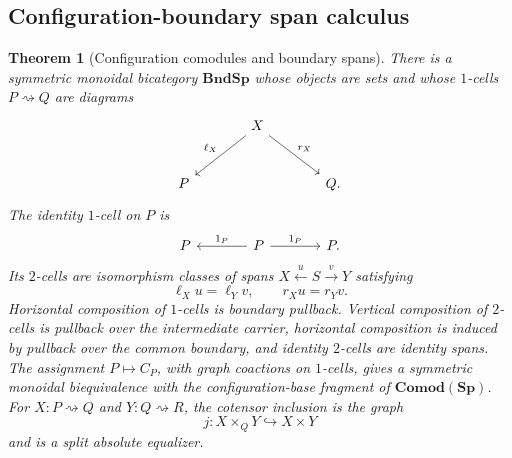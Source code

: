 \documentclass[oneside]{article}
\newcommand{\Sp}{\mathbf{Sp}}
\theoremstyle{plain}
\newtheorem{theorem}{Theorem}[section]
\theoremstyle{definition}
\theoremstyle{remark}
\begin{document}
\subsection{Configuration-boundary span calculus}

\begin{theorem}[Configuration comodules and boundary spans]
\label{thm:cgqg-split-cotensor}
There is a symmetric monoidal bicategory \(\mathbf{BndSp}\) whose objects
are sets and whose \(1\)-cells \(P\rightsquigarrow Q\) are diagrams
\[
 \begin{tikzcd}[column sep=large,row sep=large]
 &X\arrow[dl,"\ell_X"']\arrow[dr,"r_X"]&\\
 P&&Q.
 \end{tikzcd}
\]
The identity \(1\)-cell on \(P\) is
\[
 \begin{tikzcd}[column sep=large]
 P&P\arrow[l,"1_P"']\arrow[r,"1_P"]&P.
 \end{tikzcd}
\]
Its \(2\)-cells are isomorphism classes of spans
\(X\xleftarrow{u}S\xrightarrow{v}Y\) satisfying
\[
 \ell_Xu=\ell_Yv,\qquad r_Xu=r_Yv.
\]
Horizontal composition of \(1\)-cells is boundary pullback. Vertical
composition of \(2\)-cells is pullback over the intermediate carrier,
horizontal composition is induced by pullback over the common boundary,
and identity \(2\)-cells are identity spans. The assignment \(P\mapsto C_P\),
with graph coactions on \(1\)-cells, gives a symmetric monoidal
biequivalence with the configuration-base fragment of
\(\mathbf{Comod}(\Sp)\). For \(X:P\rightsquigarrow Q\) and
\(Y:Q\rightsquigarrow R\), the cotensor inclusion is the graph
\[
 j:X\times_QY\hookrightarrow X\times Y
\]
and is a split absolute equalizer.
\end{theorem}
\end{document}
